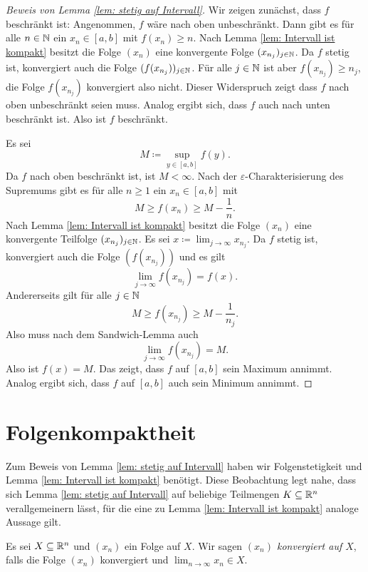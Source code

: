 \documentclass[a4paper,10pt]{article}
\begin{document}
\begin{proof}[Beweis von Lemma \ref{lem: stetig auf Intervall}]
 Wir zeigen zunächst, dass $f$ beschränkt ist: Angenommen, $f$ wäre nach oben unbeschränkt. Dann gibt es für alle $n \in \mathbb{N}$ ein $x_n \in [a,b]$ mit $f(x_n) \geq n$. Nach Lemma \ref{lem: Intervall ist kompakt} besitzt die Folge $(x_n)$ eine konvergente Folge $(x_{n_j})_{j \in \mathbb{N}}$. Da $f$ stetig ist, konvergiert auch die Folge $(f(x_{n_j}))_{j \in \mathbb{N}}$. Für alle $j \in \mathbb{N}$ ist aber $f(x_{n_j}) \geq n_j$, die Folge $f(x_{n_j})$ konvergiert also nicht. Dieser Widerspruch zeigt dass $f$ nach oben unbeschränkt seien muss. Analog ergibt sich, dass $f$ auch nach unten beschränkt ist. Also ist $f$ beschränkt.
 
 Es sei
 \[
  M \coloneqq \sup_{y \in [a,b]} f(y).
 \]
 Da $f$ nach oben beschränkt ist, ist $M < \infty$. Nach der $\varepsilon$-Charakterisierung des Supremums gibt es für alle $n \geq 1$ ein $x_n \in [a,b]$ mit
 \[
  M \geq f(x_n) \geq M - \frac{1}{n}.
 \]
 Nach Lemma \ref{lem: Intervall ist kompakt} besitzt die Folge $(x_n)$ eine konvergente Teilfolge $(x_{n_j})_{j \in \mathbb{N}}$. Es sei $x \coloneq \lim_{j \to \infty} x_{n_j}$. Da $f$ stetig ist, konvergiert auch die Folge $(f(x_{n_j}))$ und es gilt
 \[
  \lim_{j \to \infty} f(x_{n_j}) = f(x).
 \]
 Andererseits gilt für alle $j \in \mathbb{N}$
 \[
  M \geq f(x_{n_j}) \geq M - \frac{1}{n_j}.
 \]
 Also muss nach dem Sandwich-Lemma auch
 \[
  \lim_{j \to \infty} f(x_{n_j}) = M.
 \]
 Also ist $f(x) = M$. Das zeigt, dass $f$ auf $[a,b]$ sein Maximum annimmt. Analog ergibt sich, dass $f$ auf $[a,b]$ auch sein Minimum annimmt.
\end{proof}





\section{Folgenkompaktheit}


Zum Beweis von Lemma \ref{lem: stetig auf Intervall} haben wir Folgenstetigkeit und Lemma \ref{lem: Intervall ist kompakt} benötigt. Diese Beobachtung legt nahe, dass sich Lemma \ref{lem: stetig auf Intervall} auf beliebige Teilmengen $K \subseteq \mathbb{R}^n$ verallgemeinern lässt, für die eine zu Lemma \ref{lem: Intervall ist kompakt} analoge Aussage gilt.


\begin{defi}
 Es sei $X \subseteq \mathbb{R}^n$ und $(x_n)$ ein Folge auf $X$. Wir sagen \emph{$(x_n)$ konvergiert auf $X$}, falls die Folge $(x_n)$ konvergiert und $\lim_{n \to \infty} x_n \in X$.
\end{defi}
\end{document}
